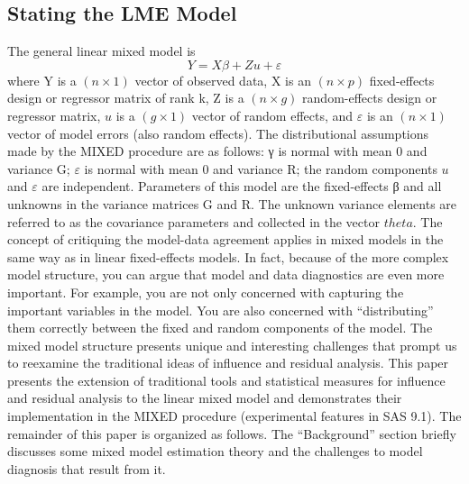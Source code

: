 \documentclass[Main.tex]{subfiles}
\begin{document}
	\subsection*{Stating the LME Model}
	The general linear mixed
	model is
	\[
	Y = X\beta + Zu + \varepsilon\]
	where Y is a $(n\times1)$ vector of observed data, X is an $(n\times p)$ fixed-effects design or regressor matrix of rank
	k, Z is a $(n \times g)$ random-effects design or regressor matrix, $u$ is a $(g \times 1)$ vector of random effects, and $\varepsilon$ is
	an $(n\times1)$ vector of model errors (also random effects). The distributional assumptions made by the MIXED
	procedure are as follows: γ is normal with mean 0 and variance G; $\varepsilon$ is normal with mean 0 and variance
	R; the random components $u$ and $\varepsilon$ are independent. Parameters of this model are the fixed-effects β and
	all unknowns in the variance matrices G and R. The unknown variance elements are referred to as the
	covariance parameters and collected in the vector $theta$.
	The concept of critiquing the model-data agreement applies in mixed models in the same way as in linear
	fixed-effects models. In fact, because of the more complex model structure, you can argue that model and
	data diagnostics are even more important. For example, you are not only concerned with capturing the
	important variables in the model. You are also concerned with “distributing” them correctly between the
	fixed and random components of the model. The mixed model structure presents unique and interesting
	challenges that prompt us to reexamine the traditional ideas of influence and residual analysis.
	This paper presents the extension of traditional tools and statistical measures for influence and residual
	analysis to the linear mixed model and demonstrates their implementation in the MIXED procedure (experimental
	features in SAS 9.1). The remainder of this paper is organized as follows. The “Background” section
	briefly discusses some mixed model estimation theory and the challenges to model diagnosis that result
	from it.
	
%	
%	
	\newpage
\end{document}
